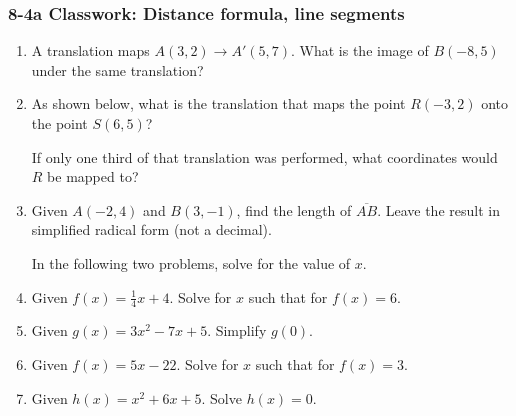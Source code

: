 \documentclass[12pt, twoside]{article}
\begin{document}
\subsubsection*{8-4a Classwork: Distance formula, line segments}
 \begin{enumerate}

  \item A translation maps $A(3,2) \rightarrow A'(5,7)$. What is the image of $B(-8,5)$ under the same translation?  \vspace{3cm}

  \item As shown below, what is the translation that maps the point $R(-3,2)$ onto the point $S(6, 5)$?
    \begin{center} %
    \end{center}
    If only one third of that translation was performed, what coordinates would $R$ be mapped to? \vspace{2cm}

  \item Given $A(-2,4)$ and $B(3,-1)$, find the length of $\overline{AB}$. Leave the result in simplified radical form (not a decimal).
      \vspace{4cm}

\newpage

  In the following two problems, solve for the value of $x$.

\vspace{3cm}

  \item Given $f(x)=\frac{1}{4} x+4$. Solve for $x$ such that for $f(x)=6$. \vspace{3.5cm}
  \item Given $g(x)=3x^2-7x+5$. Simplify $g(0)$. \vspace{3cm}
  \item Given $f(x)=5x-22$. Solve for $x$ such that for $f(x)=3$. \vspace{3.5cm}
  \item Given $h(x)=x^2+6x+5$. Solve $h(x)=0$. \vspace{3cm}


  \end{enumerate}

  
\end{document}
